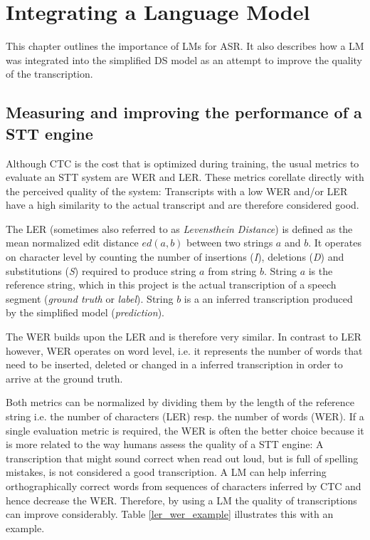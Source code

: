 \section{Integrating a Language Model}\label{lm}

This chapter outlines the importance of \ac{LM}s for \ac{ASR}. It also describes how a \ac{LM} was integrated into the simplified \ac{DS} model as an attempt to improve the quality of the transcription.

\subsection{Measuring and improving the performance of a \ac{STT} engine}

Although \ac{CTC} is the cost that is optimized during training, the usual metrics to evaluate an \ac{STT} system are \ac{WER} and \ac{LER}. These metrics corellate directly with the perceived quality of the system: Transcripts with a low \ac{WER} and/or \ac{LER} have a high similarity to the actual transcript and are therefore considered good.

The \ac{LER} (sometimes also referred to as \textit{Levensthein Distance}) is defined as the mean normalized edit distance $ed(a, b)$ between two strings $a$ and $b$. It operates on character level by counting the number of insertions (\textit{I}), deletions (\textit{D}) and substitutions (\textit{S}) required to produce string $a$ from string $b$. String $a$ is the reference string, which in this project is the actual transcription of a speech segment (\textit{ground truth} or \textit{label}). String $b$ is a an inferred transcription produced by the simplified model (\textit{prediction}).  

The \ac{WER} builds upon the \ac{LER} and is therefore very similar. In contrast to \ac{LER} however, \ac{WER} operates on word level, i.e. it represents the number of words that need to be inserted, deleted or changed in a inferred transcription in order to arrive at the ground truth.

Both metrics can be normalized by dividing them by the length of the reference string i.e. the number of characters (\ac{LER}) resp. the number of words (\ac{WER}). If a single evaluation metric is required, the \ac{WER} is often the better choice because it is more related to the way humans assess the quality of a \ac{STT} engine: A transcription that might sound correct when read out loud, but is full of spelling mistakes, is not considered a good transcription. A \ac{LM} can help inferring orthographically correct words from sequences of characters inferred by \ac{CTC} and hence decrease the \ac{WER}. Therefore, by using a \ac{LM} the quality of transcriptions can improve considerably. Table \ref{ler_wer_example} illustrates this with an example.

